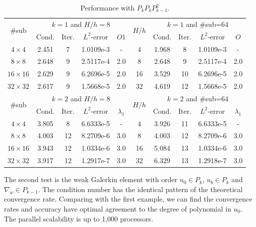 	
	\begin{table}[h]
		\small
		\setlength{\tabcolsep}{1pt} {
			\caption{ Performance with $P_{k}P_{k}P_{k-1}^2$.}
			\label{Tab:case1_PkPkPk-1}
			\begin{center}
				\begin{tabular}{c|cccc|c|cccc}
					\hline
					\multirow{2}{*}{\#sub} &\multicolumn{4}{c|}{$k=1$ and $H/h=8$} &\multirow{2}{*}{$H/h$} &\multicolumn{4}{c}{$k=1$ and \#sub=64}\\ 
					& Cond.   & Iter. &$L^2$-error & $O1$ & & Cond.   & Iter. &$L^2$-error & $O$\\
					\hline
					$4\times 4$ & 2.451 & 7 & 1.0109e-3 & - &$4$ &1.968 &8 &1.0109e-3 &-\\
					$8\times 8$ &2.648 &9 &2.5117e-4 &	2.0  &8 &2.648 &9 &2.5117e-4 &2.0 \\
					$16\times 16$ &2.629 &9 &	6.2696e-5 &2.0  &16 &3.529 &10 &6.2696e-5 &2.0\\
					$32\times 32$ &2.617 &9 &1.5668e-5 &2.0  &32 &4.619 &12 &1.5668e-5 &2.0\\
					\hline
					\multirow{2}{*}{\#sub} &\multicolumn{4}{c|}{$k=2$ and $H/h=8$} &\multirow{2}{*}{$H/h$} &\multicolumn{4}{c}{$k=2$ and \#sub=64}\\ 
					& Cond.   & Iter. &$L^2$-error &  $\lambda_1$ & & Cond.   & Iter. &$L^2$-error & $\lambda_1$\\
					\hline
					$4\times 4$ & 3.805 &8 &6.6333e-5  &- &4 &3.926 &11 &6.6333e-5  &-\\
					$8\times 8$ & 4.003 &12 &8.2709e-6  & 3.0 &8 &4.003 &12 &8.2709e-6  &3.0 \\
					$16\times 16$ &3.943 &12 &1.0334e-6  &3.0 &16 &5.084 &13 &1.0334e-6  &3.0\\
					$32\times 32$ &3.917 &12 &1.2917e-7  &3.0 &32 &6.329 &13 &1.2918e-7  &3.0\\
					\hline
				\end{tabular}
			\end{center} }
		\end{table}
		
		The second test is the weak Galerkin element with order $ u_{0} \in P_{k} $, $ u_{b} \in P_{k} $ and $ \nabla_{w} \in P_{k - 1} $. The condition number has the identical pattern of the theoretical convergence rate. Comparing with the first example, we can find the convergence rates and accuracy have optimal agreement to the degree of polynomial in $ u_{0} $. The parallel scalability is up to 1,000 processors.
		
